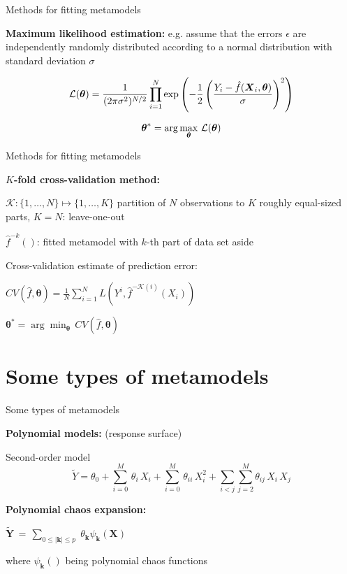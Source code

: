 \documentclass{beamer}
\begin{document}
\begin{frame}[t]{Methods for fitting metamodels}

{\bf Maximum likelihood estimation:} e.g. assume that the errors $\epsilon$ are independently randomly distributed according to a normal distribution with standard deviation $\sigma$

\[
\mathcal{L}(\boldsymbol{\theta}) = \frac{1}{ (2 \pi \sigma^2)^{N/2}} \prod_{i=1}^N \exp\left( - \frac{1}{2} \left( \frac{Y_i - \hat{f}(\boldsymbol{X}_i, \boldsymbol{\theta}) }{\sigma} \right) ^2 \right)
\]

\[
\boldsymbol{\theta}^* = \arg \max_{\boldsymbol{\theta}} \, \mathcal{L}(\boldsymbol{\theta})
\]
  
\end{frame}


\begin{frame}[t]{Methods for fitting metamodels}

{\bf $K$-fold cross-validation method:}

$\mathcal{K}: \{1, \dots , N\} \mapsto \{1, \dots, K\}$ partition of $N$ observations to $K$ roughly equal-sized parts, $K=N$: leave-one-out

$\hat{f}^{-k}()$: fitted metamodel with $k$-th part of data set aside

Cross-validation estimate of prediction error:
\begin{center}
$CV(\hat{f}, \boldsymbol{\theta}) = \frac{1}{N} \sum_{i=1}^N L ( Y^i, \hat{f}^{-\mathcal{K}(i)}(X_i) )$
\end{center}

\begin{center}
$
\boldsymbol{\theta}^* = \arg \min_{\boldsymbol{\theta}} \, CV(\hat{f}, \boldsymbol{\theta})
$
\end{center}

\end{frame}


\section{Some types of metamodels}
\begin{frame}[t]{Some types of metamodels}

{\bf Polynomial models:} (response surface)

Second-order model
\[
\tilde{Y} = \theta_0 + \sum_{i=0}^M \, \theta_i \, X_i + \sum_{i=0}^M \, \theta_{ii} \,X_i^2 + \sum_{i<j} \sum_{j=2}^M \theta_{ij} \,X_i \, X_j
\]

{\bf Polynomial chaos expansion:} 
\begin{center}
$\displaystyle{ \tilde{\boldsymbol{Y}} }\,  = \, 
\sum_{0 \leq |\boldsymbol{k}| \leq p}  \; \theta_{\boldsymbol{k}} \psi_{\boldsymbol{k}}(\boldsymbol{X})  \, $
\end{center}
where $\psi_{\boldsymbol{k}}()$ being polynomial chaos functions

\end{frame}
\end{document}
